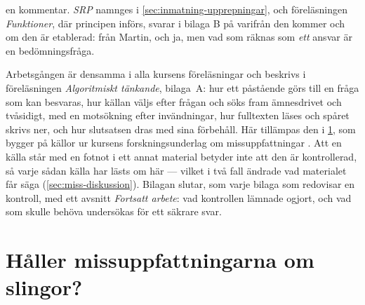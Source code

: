  en kommentar.
\emph{SRP} namnges i
\cref{sec:inmatning-upprepningar}, och föreläsningen \emph{Funktioner},
där principen införs, svarar i bilaga B på varifrån den kommer och om den
är etablerad: från Martin, och ja, men vad som räknas som \emph{ett}
ansvar är en bedömningsfråga.%

Arbetsgången är densamma i alla kursens föreläsningar och beskrivs i
föreläsningen \emph{Algoritmiskt tänkande}, bilaga~A: hur ett påstående
görs till en fråga som kan besvaras, hur källan väljs efter frågan och
söks fram ämnesdrivet och tvåsidigt, med en motsökning efter
invändningar, hur fulltexten läses och spåret skrivs ner, och hur
slutsatsen dras med sina förbehåll.  Här tillämpas den i
\cref{app:missuppfattningar-upprepningar}, som bygger på källor ur
kursens forskningsunderlag om missuppfattningar
\autocite{SooriBosk2026}.  Att en källa står med en fotnot i ett annat
material betyder inte att den är kontrollerad, så varje sådan källa har
lästs om här --- vilket i två fall ändrade vad materialet får säga
(\cref{sec:miss-diskussion}).  Bilagan slutar, som varje bilaga som
redovisar en kontroll, med ett avsnitt \emph{Fortsatt arbete}: vad
kontrollen lämnade ogjort, och vad som skulle behöva undersökas för ett
säkrare svar.

\chapter{Håller missuppfattningarna om slingor?}
\label{app:missuppfattningar-upprepningar}

